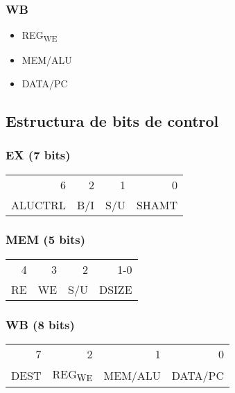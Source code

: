 \documentclass[11pt]{article}
\begin{document}
\subsubsection{WB}
\label{sec:orge0f648c}

\begin{itemize}
\item REG\textsubscript{WE}
\item MEM/ALU
\item DATA/PC
\end{itemize}

\subsection{Estructura de bits de control}
\label{sec:org178ebe2}

\subsubsection{EX (7 bits)}
\label{sec:org4c191eb}

\begin{center}
\begin{tabular}{rrrr}
6 & 2 & 1 & 0\\
ALUCTRL & B/I & S/U & SHAMT\\
\end{tabular}
\end{center}

\subsubsection{MEM (5 bits)}
\label{sec:org6e27b75}

\begin{center}
\begin{tabular}{rrrr}
4 & 3 & 2 & 1-0\\
RE & WE & S/U & DSIZE\\
\end{tabular}
\end{center}

\subsubsection{WB (8 bits)}
\label{sec:orgc270fc3}

\begin{center}
\begin{tabular}{rrrr}
7 & 2 & 1 & 0\\
DEST & REG\textsubscript{WE} & MEM/ALU & DATA/PC\\
\end{tabular}
\end{center}
\end{document}
